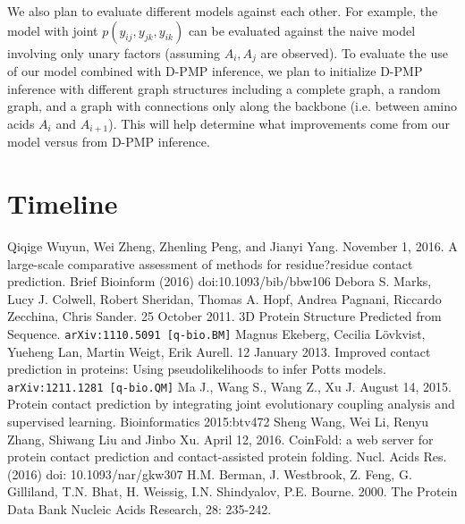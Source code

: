 \documentclass{article}
\begin{document}
We also plan to evaluate different models against each other. For example, the model with joint $p(y_{ij}, y_{jk}, y_{ik})$ can be evaluated against the naive model involving only unary factors (assuming $A_i, A_j$ are observed). To evaluate the use of our model combined with D-PMP inference, we plan to initialize D-PMP inference with different graph structures including a complete graph, a random graph, and a graph with connections only along the backbone (i.e. between amino acids $A_i$ and $A_{i+1}$). This will help determine what improvements come from our model versus from D-PMP inference. 

\section{Timeline}


\begin{thebibliography}{9}
	Qiqige Wuyun, Wei Zheng, Zhenling Peng, and Jianyi Yang. November 1, 2016. A large-scale comparative assessment of methods for residue?residue contact prediction. Brief Bioinform (2016) doi:10.1093/bib/bbw106
	Debora S. Marks, Lucy J. Colwell, Robert Sheridan, Thomas A. Hopf, Andrea Pagnani, Riccardo Zecchina, Chris Sander. 25 October 2011. 3D Protein Structure Predicted from Sequence. {\tt arXiv:1110.5091 [q-bio.BM]}
	Magnus Ekeberg, Cecilia L{\"o}vkvist, Yueheng Lan, Martin Weigt, Erik Aurell. 12 January 2013. Improved contact prediction in proteins: Using pseudolikelihoods to infer Potts models. {\tt arXiv:1211.1281 [q-bio.QM]}
	 Ma J., Wang S., Wang Z., Xu J. August 14, 2015. Protein contact prediction by integrating joint evolutionary coupling analysis and supervised learning. Bioinformatics 2015:btv472
	Sheng Wang,  Wei Li, Renyu Zhang, Shiwang Liu and Jinbo Xu. April 12, 2016. CoinFold: a web server for protein contact prediction and contact-assisted protein folding. Nucl. Acids Res. (2016) doi: 10.1093/nar/gkw307
	H.M. Berman, J. Westbrook, Z. Feng, G. Gilliland, T.N. Bhat, H. Weissig, I.N. Shindyalov, P.E. Bourne. 2000. The Protein Data Bank
Nucleic Acids Research, 28: 235-242.
\end{thebibliography}
\end{document}
